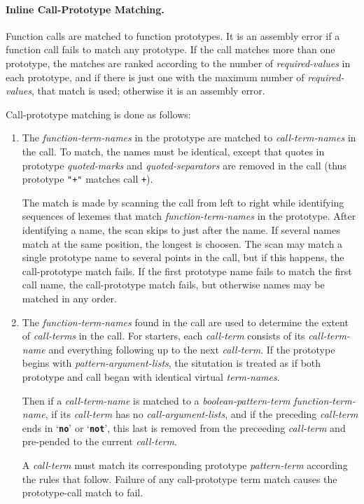 \documentclass[12pt]{article}
\newcommand{\subsubsubsection}[1]{\paragraph[#1]{#1.}}
\newcommand{\TT}[1]{{\tt \bfseries #1}}
\begin{document}
\subsubsubsection{Inline Call-Prototype Matching}
\label{INLINE-CALL-PROTOTYPE-MATCHING}

Function calls are matched to function prototypes.  It is
an assembly error if a function call fails to match any
prototype.  If the call matches more than one prototype, the
matches are ranked according to the number of {\em required-values}
in each prototype, and if there is just one with the maximum
number of {\em required-values}, that match is used; otherwise
it is an assembly error.

Call-prototype matching is done as follows:

\begin{enumerate}
\item The {\em function-term-names} in the prototype are matched to
{\em call-term-names} in the call.  To match, the names must be identical,
except that quotes in prototype
{\em quoted-marks} and {\em quoted-separators} are removed in the call
(thus prototype {\tt "+"} matches call {\tt +}).

The match is made by scanning the call from left to
right while identifying sequences of lexemes that match
{\em function-term-names} in the prototype.  After identifying
a name, the scan skips to just after the name.  If several
names match at the same position, the longest is choosen.
The scan may match a single prototype name to several points in the
call, but if this happens, the call-prototype match fails.
If the first prototype name fails to match the first call name,
the call-prototype match fails, but otherwise names may be matched
in any order.

\item
The {\em function-term-names} found in the call are used to determine
the extent of {\em call-terms} in the call.  For starters, each
{\em call-term} consists of its {\em call-term-name} and everything
following up to the next {\em call-term}.  If the prototype begins
with {\em pattern-argument-lists}, the situtation is treated as
if both prototype and call began with identical virtual
{\em term-names}.

Then if a {\em call-term-name} is matched to a {\em boolean-pattern-term}
{\em function-term-name}, if its {\em call-term} has no
{\em call-argument-lists}, and if the preceding {\em call-term}
ends in `\TT{no}' or `\TT{not}', this last is removed from the
preceeding {\em call-term} and pre-pended to the
current {\em call-term}.

A {\em call-term}
must match its corresponding prototype {\em pattern-term} according
the rules that follow.  Failure of any call-prototype term match
causes the prototype-call match to fail.


\end{enumerate}
\end{document}
